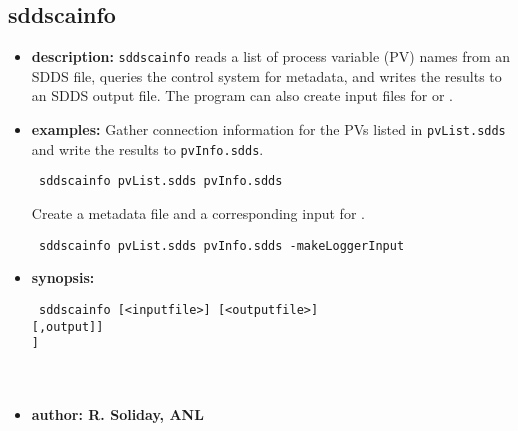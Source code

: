 %
%
\begin{latexonly}
\newpage
\end{latexonly}

\subsection{sddscainfo}
\label{sddscainfo}

\begin{itemize}
\item {\bf description:}
  \verb+sddscainfo+ reads a list of process variable (PV) names from an SDDS file,
  queries the control system for metadata, and writes the results to an SDDS output file.
  The program can also create input files for  or .

\item {\bf examples:}
  Gather connection information for the PVs listed in \verb+pvList.sdds+ and write the results to \verb+pvInfo.sdds+.
  \begin{flushleft}{\tt
sddscainfo pvList.sdds pvInfo.sdds
  }\end{flushleft}
  Create a metadata file and a corresponding input for .
  \begin{flushleft}{\tt
sddscainfo pvList.sdds pvInfo.sdds -makeLoggerInput
  }\end{flushleft}

\item {\bf synopsis:}
  \begin{flushleft}{\tt
sddscainfo [<inputfile>] [<outputfile>]\\
[-pipe=[input][,output]]\\
[-makeLoggerInput[=withStorageType]]\\
[-makeSCRInput]\\
[-verbose]\\
[-pendIOTime=<seconds>]
  }\end{flushleft}

\item {\bf author: R. Soliday, ANL}
\end{itemize}
